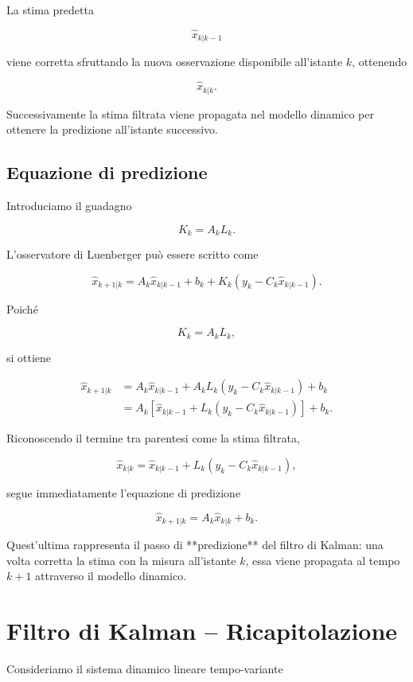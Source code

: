 \documentclass[11pt,a4paper]{article}
\begin{document}
La stima predetta

\[
\hat{x}_{k|k-1}
\]

viene corretta sfruttando la nuova osservazione disponibile all'istante \(k\), ottenendo

\[
\hat{x}_{k|k}.
\]

Successivamente la stima filtrata viene propagata nel modello dinamico per ottenere la predizione all'istante successivo.

\subsection*{Equazione di predizione}

Introduciamo il guadagno

\[
\boxed{
K_k=A_kL_k.
}
\]

L'osservatore di Luenberger può essere scritto come

\[
\hat{x}_{k+1|k}
=
A_k\hat{x}_{k|k-1}
+
b_k
+
K_k
\left(
y_k-C_k\hat{x}_{k|k-1}
\right).
\]

Poiché

\[
K_k=A_kL_k,
\]

si ottiene

\[
\begin{aligned}
\hat{x}_{k+1|k}
&=
A_k\hat{x}_{k|k-1}
+
A_kL_k
\left(
y_k-C_k\hat{x}_{k|k-1}
\right)
+
b_k
\\[1mm]
&=
A_k
\left[
\hat{x}_{k|k-1}
+
L_k
\left(
y_k-C_k\hat{x}_{k|k-1}
\right)
\right]
+
b_k.
\end{aligned}
\]

Riconoscendo il termine tra parentesi come la stima filtrata,

\[
\boxed{
\hat{x}_{k|k}
=
\hat{x}_{k|k-1}
+
L_k
\left(
y_k-C_k\hat{x}_{k|k-1}
\right),
}
\]

segue immediatamente l'equazione di predizione

\[
\boxed{
\hat{x}_{k+1|k}
=
A_k\hat{x}_{k|k}
+
b_k.
}
\]

Quest'ultima rappresenta il passo di **predizione** del filtro di Kalman: una volta corretta la stima con la misura all'istante \(k\), essa viene propagata al tempo \(k+1\) attraverso il modello dinamico.


\section{Filtro di Kalman -- Ricapitolazione}

Consideriamo il sistema dinamico lineare tempo-variante
\end{document}
